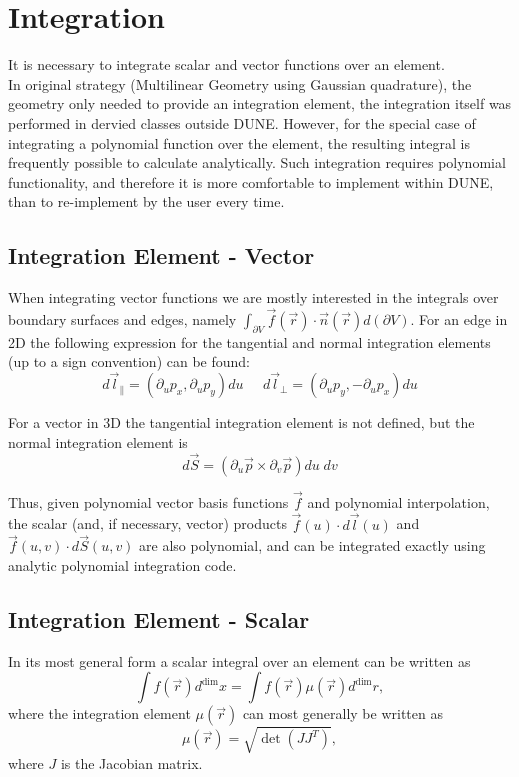 \documentclass[12pt]{article}
\begin{document}
\section{Integration}

It is necessary to integrate scalar and vector functions over an element. \\

\noindent
In original strategy (Multilinear Geometry using Gaussian quadrature), the geometry only needed to provide an integration element, the integration itself was performed in dervied classes outside DUNE. However, for the special case of integrating a polynomial function over the element, the resulting integral is frequently possible to calculate analytically. Such integration requires polynomial functionality, and therefore it is more comfortable to implement within DUNE, than to re-implement by the user every time.

\subsection{Integration Element - Vector}

When integrating vector functions we are mostly interested in the integrals over boundary surfaces and edges, namely $\int_{\partial V} \vec{f}(\vec{r}) \cdot \vec{n}(\vec{r}) d(\partial V)$. For an edge in 2D the following expression for the tangential and normal integration elements (up to a sign convention) can be found:
\[ d\vec{l}_{\parallel} = (\partial_u p_x, \partial_u p_y)du \; \; \; \; \; d\vec{l}_{\perp} = (\partial_u p_y, -\partial_u p_x)du  \]

\noindent
For a vector in 3D the tangential integration element is not defined, but the normal integration element is
\[ d\vec{S} = (\partial_u \vec{p} \times \partial_v \vec{p})du \; dv  \]

\noindent
Thus, given polynomial vector basis functions $\vec{f}$ and polynomial interpolation, the scalar (and, if necessary, vector) products $\vec{f}(u) \cdot d\vec{l}(u)$ and $\vec{f}(u,v) \cdot d\vec{S}(u,v)$ are also polynomial, and can be integrated exactly using analytic polynomial integration code.

\subsection{Integration Element - Scalar}

In its most general form a scalar integral over an element can be written as \[\int f(\vec{r}) d^{\dim} x = \int f(\vec{r}) \mu(\vec{r}) d^{\dim} r,\] where the integration element $\mu(\vec{r})$ can most generally be written as \[\mu(\vec{r}) = \sqrt{\det(J J^T)},\] where $J$ is the Jacobian matrix. \\
\end{document}
